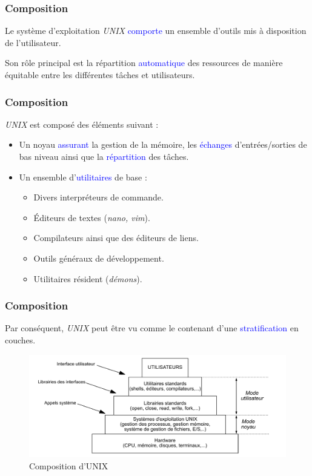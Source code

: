 \documentclass[aspectratio=169]{beamer}
\begin{document}
\begin{frame}
  \frametitle{Composition}
  Le système  d'exploitation \textit{UNIX} \textcolor{blue}{comporte} un ensemble
  d'outils mis à disposition de l'utilisateur.

  \hspace{0.5cm}

  Son rôle principal est la répartition \textcolor{blue}{automatique} des
ressources de manière équitable entre les différentes tâches et utilisateurs.
\end{frame}

\begin{frame}
  \frametitle{Composition}
  \textit{UNIX} est composé des éléments suivant :

  \hspace{0.5cm}

  \begin{itemize}
  \item Un noyau \textcolor{blue}{assurant} la gestion de la mémoire, les
  \textcolor{blue}{échanges} d'entrées/sorties de bas niveau ainsi que la
  \textcolor{blue}{répartition} des tâches.

  \item Un ensemble d'\textcolor{blue}{utilitaires} de base :

    \begin{itemize}
    \item Divers interpréteurs de commande.

    \item Éditeurs de textes (\textit{nano, vim}).

    \item Compilateurs ainsi que des éditeurs de liens.

    \item Outils généraux de développement.

    \item Utilitaires résident (\textit{démons}).
    \end{itemize}
  \end{itemize}
\end{frame}

\begin{frame}
  \frametitle{Composition}

  Par conséquent, \textit{UNIX} peut être vu comme le contenant d'une
  \textcolor{blue}{stratification} en couches.

  \begin{figure}[!h]
    \centering
    \includegraphics[scale=0.5]
    {textures/images/unix/composition.pdf}
    \caption{Composition d'UNIX}
  \end{figure}
\end{frame}
\end{document}
